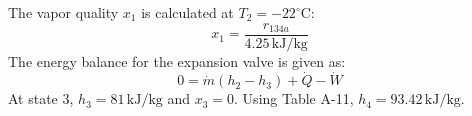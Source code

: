 The vapor quality \( x_1 \) is calculated at \( T_2 = -22^\circ\text{C} \):  
\[
x_1 = \frac{r_{134a}}{4.25 \, \text{kJ/kg}}
\]  
The energy balance for the expansion valve is given as:  
\[
0 = \dot{m}(h_2 - h_3) + \dot{Q} - \dot{W}
\]  
At state 3, \( h_3 = 81 \, \text{kJ/kg} \) and \( x_3 = 0 \). Using Table A-11, \( h_4 = 93.42 \, \text{kJ/kg} \).